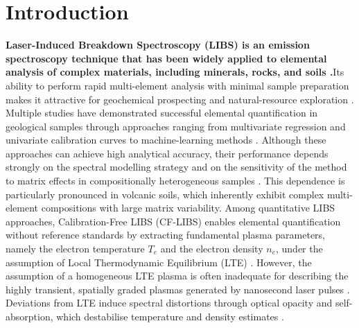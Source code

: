 \documentclass{iopjournal}
\begin{document}
\section{Introduction}

\textbf{Laser-Induced Breakdown Spectroscopy (LIBS) is an emission spectroscopy technique that has been widely applied to elemental analysis of complex materials, including minerals, rocks, and soils \cite{legnaioli_laser-induced_2025}.}Its ability to perform rapid multi-element analysis with minimal sample preparation makes it attractive for geochemical prospecting and natural-resource exploration \cite{sawyers_database_2025}. Multiple studies have demonstrated successful elemental quantification in geological samples through approaches ranging from multivariate regression and univariate calibration curves to machine-learning methods \cite{babos_laser-induced_2024, manzoor_machine_2025, zhang_improving_2025}. Although these approaches can achieve high analytical accuracy, their performance depends strongly on the spectral modelling strategy and on the sensitivity of the method to matrix effects in compositionally heterogeneous samples \cite{hao_machine_2024, manelski_libs_2024}. This dependence is particularly pronounced in volcanic soils, which inherently exhibit complex multi-element compositions with large matrix variability. Among quantitative LIBS approaches, Calibration-Free LIBS (CF-LIBS) enables elemental quantification without reference standards by extracting fundamental plasma parameters, namely the electron temperature $T_e$ and the electron density $n_e$, under the assumption of Local Thermodynamic Equilibrium (LTE) \cite{cristoforetti_local_2010}. However, the assumption of a homogeneous LTE plasma is often inadequate for describing the highly transient, spatially graded plasmas generated by nanosecond laser pulses \cite{zaitsev_two-zone_2024, bultel_mcwhirter_2025}. Deviations from LTE induce spectral distortions through optical opacity and self-absorption, which destabilise temperature and density estimates \cite{tang_review_2024, hansen_modeling_2021}.
\end{document}
